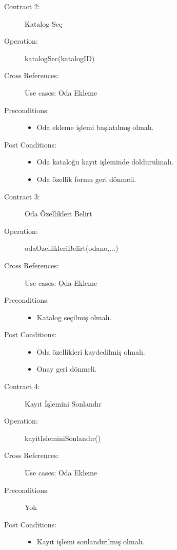 \documentclass[12pt,a4paper]{report}
\begin{document}
\begin{description}
\item[Contract 2:] Katalog Seç
\item[Operation:] katalogSec(katalogID)
\item[Cross References:] Use cases: Oda Ekleme
\item[Preconditions:] \hspace{10 mm}
\begin{itemize}
\item Oda ekleme işlemi başlatılmış olmalı.
\end{itemize}
\item[Post Conditions:] \hspace{10 mm}
\begin{itemize} 
\item Oda kataloğu kayıt işleminde doldurulmalı.
\item Oda özellik formu geri dönmeli. \\
\end{itemize}
\end{description}

\begin{description}
\item[Contract 3:] Oda Özellikleri Belirt
\item[Operation:] odaOzellikleriBelirt(odano,...)
\item[Cross References:] Use cases: Oda Ekleme
\item[Preconditions:] \hspace{10 mm}
\begin{itemize}
\item Katalog seçilmiş olmalı.
\end{itemize}
\item[Post Conditions:] \hspace{10 mm}
\begin{itemize} 
\item Oda özellikleri kaydedilmiş olmalı.
\item Onay geri dönmeli. \\
\end{itemize}
\end{description}

\begin{description}
\item[Contract 4:] Kayıt İşlemini Sonlandır
\item[Operation:] kayitIsleminiSonlandır()
\item[Cross References:] Use cases: Oda Ekleme
\item[Preconditions:] Yok
\item[Post Conditions:] \hspace{10 mm}
\begin{itemize} 
\item Kayıt işlemi sonlandırılmış olmalı. \\
\end{itemize}
\end{description}
\end{document}
